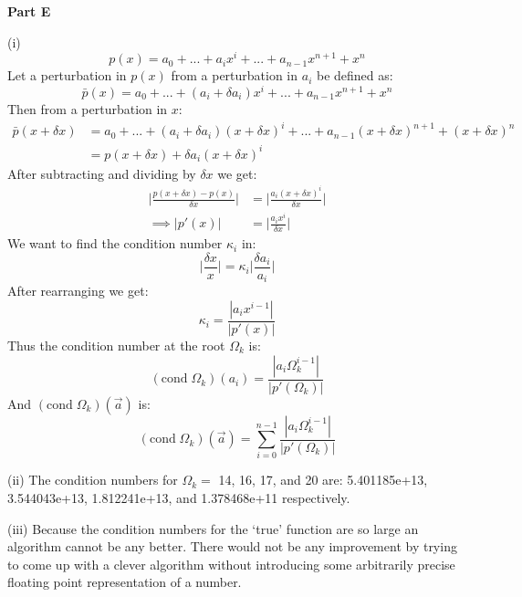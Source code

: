 \documentclass[12pt]{article}
\begin{document}
\noindent
\textbf{Part E}

(i)
\[
p(x) = a_0 + ... + a_i x^i + ... + a_{n-1} x^{n+1} + x^n
\]
Let a perturbation in $p(x)$ from a perturbation in $a_i$ be defined as:
\[
\bar{p}(x) = a_0 + ... + (a_i + \delta a_i) x^i + ... + a_{n-1} x^{n+1} + x^n
\]
Then from a perturbation in $x$:
\begin{align*}
\bar{p}(x + \delta x) &= a_0 + ... + (a_i + \delta a_i) (x + \delta x)^i + ... + a_{n-1} (x + \delta x)^{n+1} + (x + \delta x)^n
\\
&= p(x + \delta x) + \delta  a_i (x + \delta x)^i
\end{align*}
After subtracting and dividing by $\delta x$ we get:
\begin{align*}
\bigg|\frac{p(x + \delta x) - p(x)}{\delta x}\bigg| &= \bigg| \frac{a_i (x + \delta x)^i}{\delta x} \bigg|
\\
\implies |p'(x)| &= \bigg| \frac{a_i x^i}{\delta x} \bigg|
\end{align*}
We want to find the condition number $\kappa_i$ in:
\[
\bigg|\frac{\delta x}{x} \bigg| = \kappa_i \bigg| \frac{\delta a_i}{a_i} \bigg|
\]
After rearranging we get:
\[
\kappa_i = \frac{|a_i x^{i-1}|}{|p'(x)|}
\]
Thus the condition number at the root $\Omega_k$ is:
\[
(\mathrm{cond} \; \Omega_k)(a_i) = \frac{|a_i \Omega_k^{i-1}|}{|p'(\Omega_k)|}
\]
And $(\mathrm{cond} \; \Omega_k)(\vec{a})$ is:
\[
(\mathrm{cond} \; \Omega_k)(\vec{a}) = \sum_{i=0}^{n-1} \frac{|a_i \Omega_k^{i-1}|}{|p'(\Omega_k)|}
\]

(ii) The condition numbers for $\Omega_k =$ 14, 16, 17, and 20 are: 5.401185e+13, 3.544043e+13, 1.812241e+13, and 1.378468e+11 respectively.

(iii) Because the condition numbers for the `true' function are so large an algorithm cannot be any better. There would not be any improvement by trying to come up with a clever algorithm without introducing some arbitrarily precise floating point representation of a number.
\end{document}
